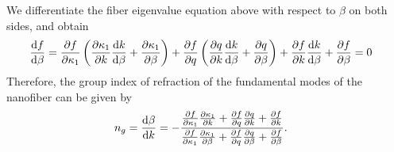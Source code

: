\documentclass[preprint,aps,pra,onecolumn]{revtex4-1} %
\begin{document}
We differentiate the fiber eigenvalue equation above with respect to $ \beta $ on both sides, and obtain
\begin{align}
\dd{f}{\beta} &= \pp{f}{\kappa_1} \left(\pp{\kappa_1}{k}\dd{k}{\beta}+\pp{\kappa_1}{\beta} \right) + \pp{f}{q}\left(\pp{q}{k}\dd{k}{\beta}+\pp{q}{\beta} \right) +\pp{f}{k}\dd{k}{\beta}+\pp{f}{\beta}=0
\end{align}
Therefore, the group index of refraction of the fundamental modes of the nanofiber can be given by
\begin{align}
 n_g &= \dd{\beta}{k} = -\frac{\pp{f}{\kappa_1}\pp{\kappa_1}{k}+\pp{f}{q}\pp{q}{k}+\pp{f}{k}}
{\pp{f}{\kappa_1}\pp{\kappa_1}{\beta}+\pp{f}{q}\pp{q}{\beta}+\pp{f}{\beta}}.
\end{align}

\end{document}
